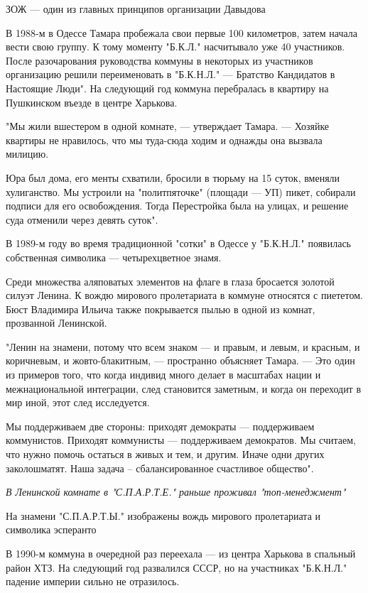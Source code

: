 \documentclass[a4paper,11pt]{extreport}
\begin{document}
ЗОЖ --- один из главных принципов организации Давыдова

В 1988-м в Одессе Тамара пробежала свои первые 100 километров, затем начала
вести свою группу. К тому моменту "Б.К.Л." насчитывало уже 40 участников. После
разочарования руководства коммуны в некоторых из участников организацию решили
переименовать в "Б.К.Н.Л." --- Братство Кандидатов в Настоящие Люди". На
следующий год коммуна перебралась в квартиру на Пушкинском въезде в центре
Харькова.

"Мы жили вшестером в одной комнате, --- утверждает Тамара. --- Хозяйке квартиры не
нравилось, что мы туда-сюда ходим и однажды она вызвала милицию. 

Юра был дома, его менты схватили, бросили в тюрьму на 15 суток, вменяли
хулиганство. Мы устроили на "политпяточке" (площади --- УП) пикет, собирали
подписи для его освобождения. Тогда Перестройка была на улицах, и решение суда
отменили через девять суток".

В 1989-м году во время традиционной "сотки" в Одессе у "Б.К.Н.Л." появилась
собственная символика --- четырехцветное знамя.

Среди множества аляповатых элементов на флаге в глаза бросается золотой силуэт
Ленина. К вождю мирового пролетариата в коммуне относятся с пиететом. Бюст
Владимира Ильича также покрывается пылью в одной из комнат, прозванной
Ленинской.

"Ленин на знамени, потому что всем знаком --- и правым, и левым, и красным, и
коричневым, и жовто-блакитным, --- пространно объясняет Тамара. --- Это один из
примеров того, что когда индивид много делает в масштабах нации и
межнациональной интеграции, след становится заметным, и когда он переходит в
мир иной, этот след исследуется. 

Мы поддерживаем две стороны: приходят демократы --- поддерживаем коммунистов.
Приходят коммунисты --- поддерживаем демократов. Мы считаем, что нужно помочь
остаться в живых и тем, и другим. Иначе одни других заколошматят. Наша задача –
сбалансированное счастливое общество".

{\em
В Ленинской комнате в "С.П.А.Р.Т.Е." раньше проживал "топ-менеджмент"
\/}

На знамени "С.П.А.Р.Т.Ы." изображены вождь мирового пролетариата и символика
эсперанто

В 1990-м коммуна в очередной раз переехала --- из центра Харькова в спальный
район ХТЗ. На следующий год развалился СССР, но на участниках "Б.К.Н.Л."
падение империи сильно не отразилось.
\end{document}

